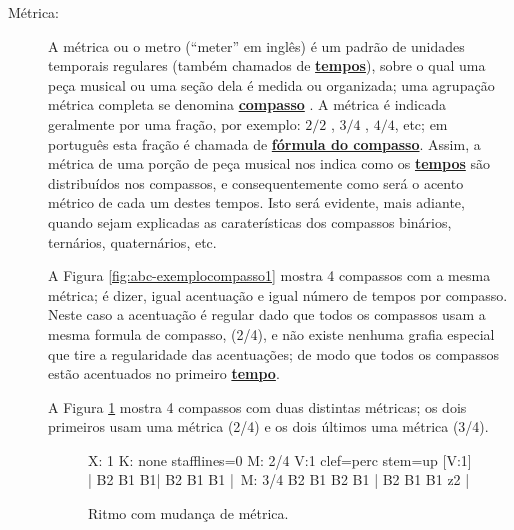 \begin{description}
\item[Métrica:] \label{def:Metrica} 
A métrica ou o metro  (``meter'' em inglês) é
um padrão de unidades temporais regulares (também chamados de \hyperref[sec:Tempo]{\textbf{tempos}}), 
sobre o qual uma peça musical ou uma seção dela é medida ou organizada;
uma agrupação métrica completa se denomina \hyperref[def:Compasso]{\textbf{compasso}} \cite[pp. 947]{latham2008diccionario} \cite[pp. 523]{apel1969harvard}.
A métrica é indicada geralmente por uma fração, por exemplo:
${2}/{2}$ , ${3}/{4}$ , ${4}/{4}$, etc; 
em português esta fração é chamada de \hyperref[def:FormulaCompasso]{\textbf{fórmula do compasso}}.
Assim, a métrica de uma porção de peça musical nos indica como os 
\hyperref[sec:Tempo]{\textbf{tempos}} são distribuídos nos compassos,
e consequentemente como será o acento métrico de cada um destes tempos. 
Isto será evidente, mais adiante, 
quando sejam explicadas as caraterísticas dos compassos binários, ternários, quaternários, etc.
\begin{example}
A Figura \ref{fig:abc-exemplocompasso1} mostra 4 compassos com a mesma métrica;
é dizer, igual acentuação e igual número de tempos por compasso.
Neste caso a acentuação é regular dado que todos os compassos usam a mesma formula de compasso, (2/4), 
e não existe nenhuma grafia especial que tire a regularidade das acentuações;
de modo que todos os compassos estão acentuados no primeiro \hyperref[sec:Tempo]{\textbf{tempo}}.
\end{example}

\begin{example}
A Figura \ref{fig:abc-exemplometrica1} mostra 4 compassos com duas distintas métricas;
os dois primeiros usam uma métrica (2/4) e os dois últimos uma métrica (3/4).
\end{example}

\begin{figure}[h]
\centering
\begin{abc}[name=abc-exemplometrica1]
%
X: 1 %
K: none stafflines=0 %
M: 2/4
V:1 clef=perc stem=up %
%
[V:1] | B2 B1 B1| B2 B1 B1 |\
M: 3/4 
B2 B1 B2 B1 | B2 B1 B1 z2  |
%       
\end{abc}
\caption{Ritmo com mudança de métrica.}
\label{fig:abc-exemplometrica1}
\end{figure}


\end{description}
